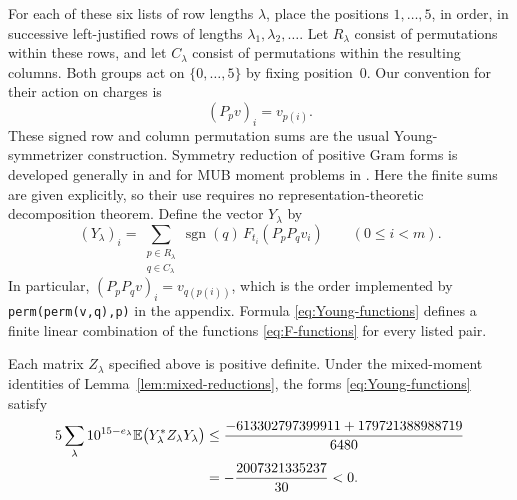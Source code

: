 For each of these six lists of row lengths $\lambda$, place the positions
$1,\ldots,5$, in order, in successive left-justified rows of lengths
$\lambda_1,\lambda_2,\ldots$. Let $R_\lambda$ consist of permutations
within these rows, and let $C_\lambda$ consist of permutations within
the resulting columns. Both groups act on $\{0,\ldots,5\}$ by fixing
position~$0$. Our convention for their action on charges is
\[
 (P_pv)_i=v_{p(i)}.
\]
These signed row and column permutation sums are the usual
Young-symmetrizer construction. Symmetry reduction of positive Gram
forms is developed generally in \cite{GatermannParrilo2004} and for MUB
moment problems in \cite{GriblingPolak2024}. Here the finite sums are
given explicitly, so their use requires no representation-theoretic
decomposition theorem.
Define the vector $Y_\lambda$ by
\begin{equation}\label{eq:Young-functions}
 (Y_\lambda)_i
    =\sum_{\substack{p\in R_\lambda\\q\in C_\lambda}}
          \operatorname{sgn}(q)\,
          F_{t_i}(P_pP_qv_i)
       \qquad(0\le i<m).
\end{equation}
In particular, $(P_pP_qv)_i=v_{q(p(i))}$, which is the order implemented
by \texttt{perm(perm(v,q),p)} in the appendix. Formula
\eqref{eq:Young-functions} defines a finite linear combination of the
functions \eqref{eq:F-functions} for every listed pair.

\begin{proposition}\label{prop:mixed-certificate}
Each matrix $Z_\lambda$ specified above is positive definite. Under the
mixed-moment identities of Lemma~\ref{lem:mixed-reductions}, the forms
\eqref{eq:Young-functions} satisfy
\begin{align}
 5\sum_\lambda 10^{15-e_\lambda}
       \mathbb E\bigl(Y_\lambda^*Z_\lambda Y_\lambda\bigr)
 &\le
       \frac{-613302797399911+179721388988719}{6480}
       \label{eq:mixed-certificate}\\
 &=-\frac{2007321335237}{30}<0.\notag
\end{align}
\end{proposition}


